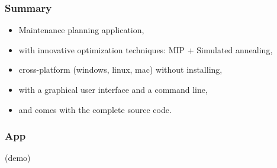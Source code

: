 \begin{frame}
\frametitle{\textbf{Summary}}

  \begin{itemize}[<+->]
    \item Maintenance planning application,
    \item with innovative optimization techniques: MIP + Simulated annealing,
    \item cross-platform (windows, linux, mac) without installing,
    \item with a graphical user interface and a command line,
    \item and comes with the complete source code.
  \end{itemize}

\end{frame}


\begin{frame}
\frametitle{\textbf{App}}

  (demo)

\end{frame}
